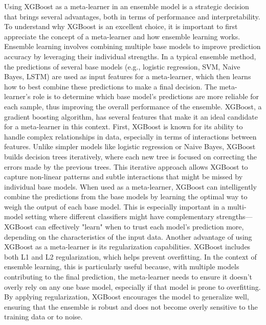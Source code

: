 \noindent
Using XGBoost as a meta-learner in an ensemble model is a strategic decision that brings several advantages, both in terms of performance and interpretability. To understand why XGBoost is an excellent choice, it is important to first appreciate the concept of a meta-learner and how ensemble learning works. Ensemble learning involves combining multiple base models to improve prediction accuracy by leveraging their individual strengths. In a typical ensemble method, the predictions of several base models (e.g., logistic regression, SVM, Naive Bayes, LSTM) are used as input features for a meta-learner, which then learns how to best combine these predictions to make a final decision. The meta-learner's role is to determine which base model's predictions are more reliable for each sample, thus improving the overall performance of the ensemble. XGBoost, a gradient boosting algorithm, has several features that make it an ideal candidate for a meta-learner in this context. First, XGBoost is known for its ability to handle complex relationships in data, especially in terms of interactions between features. Unlike simpler models like logistic regression or Naive Bayes, XGBoost builds decision trees iteratively, where each new tree is focused on correcting the errors made by the previous trees. This iterative approach allows XGBoost to capture non-linear patterns and subtle interactions that might be missed by individual base models. When used as a meta-learner, XGBoost can intelligently combine the predictions from the base models by learning the optimal way to weigh the output of each base model. This is especially important in a multi-model setting where different classifiers might have complementary strengths—XGBoost can effectively "learn" when to trust each model's prediction more, depending on the characteristics of the input data. Another advantage of using XGBoost as a meta-learner is its regularization capabilities. XGBoost includes both L1 and L2 regularization, which helps prevent overfitting. In the context of ensemble learning, this is particularly useful because, with multiple models contributing to the final prediction, the meta-learner needs to ensure it doesn't overly rely on any one base model, especially if that model is prone to overfitting. By applying regularization, XGBoost encourages the model to generalize well, ensuring that the ensemble is robust and does not become overly sensitive to the training data or to noise.


